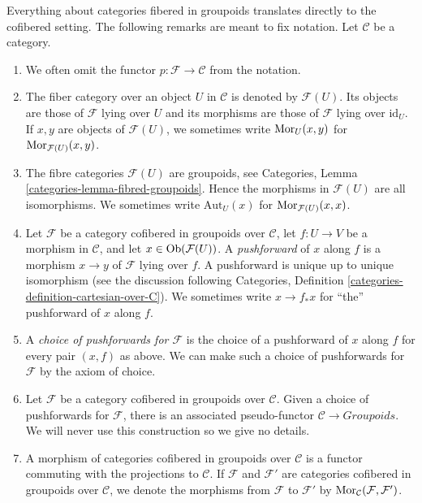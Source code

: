 \begin{remarks}
\label{remarks-cofibered-groupoids}
Everything about categories fibered in groupoids translates directly to the
cofibered setting. The following remarks are meant to fix notation.
Let $\mathcal{C}$ be a category.
\begin{enumerate}
\item We often omit the functor $p: \mathcal{F} \to \mathcal{C}$ from the
notation.
\item The fiber category over an object $U$ in $\mathcal{C}$ is denoted by
$\mathcal{F}(U)$. Its objects are those of $\mathcal{F}$ lying over $U$ and its
morphisms are those of $\mathcal{F}$ lying over $\text{id}_U$.
If $x, y$  are objects of $\mathcal{F}(U)$, we sometimes write
$\mathop{\mathrm{Mor}}\nolimits_U(x, y)$ for $\mathop{\mathrm{Mor}}\nolimits_{\mathcal{F}(U)}(x, y)$.
\item The fibre categories $\mathcal{F}(U)$ are groupoids, see
Categories, Lemma \ref{categories-lemma-fibred-groupoids}.
Hence the morphisms in $\mathcal{F}(U)$ are all isomorphisms.
We sometimes write $\text{Aut}_U(x)$ for $\mathop{\mathrm{Mor}}\nolimits_{\mathcal{F}(U)}(x, x)$.
\item
\label{item-pushforward}
Let $\mathcal{F}$ be a category cofibered in groupoids over
$\mathcal{C}$, let $f: U \to V$ be a morphism in $\mathcal{C}$, and
let $x \in \mathop{\mathrm{Ob}}\nolimits(\mathcal{F}(U))$.
A {\it pushforward} of $x$ along $f$ is a morphism
$x \to y$ of $\mathcal{F}$ lying over $f$. A pushforward
is unique up to unique isomorphism (see the discussion following
Categories, Definition \ref{categories-definition-cartesian-over-C}).
We sometimes write $x \to f_*x$ for ``the'' pushforward of $x$
along $f$.
\item A {\it choice of pushforwards for $\mathcal{F}$} is the choice of
a pushforward of $x$ along $f$ for every pair $(x, f)$ as above. We can make
such a choice of pushforwards for $\mathcal{F}$ by the axiom of choice.
\item Let $\mathcal{F}$ be a category cofibered in groupoids over
$\mathcal{C}$. Given a choice of pushforwards for $\mathcal{F}$, there
is an associated pseudo-functor $\mathcal{C} \to \textit{Groupoids}$.
We will never use this construction so we give no details.
\item
\label{item-cofibered-morphism}
A morphism of categories cofibered in groupoids over $\mathcal{C}$ is a
functor commuting with the projections to $\mathcal{C}$. If $\mathcal{F}$
and $\mathcal{F}'$ are categories cofibered in groupoids over
$\mathcal{C}$, we denote the morphisms from $\mathcal{F}$ to $\mathcal{F}'$
by $\mathop{\mathrm{Mor}}\nolimits_\mathcal{C}(\mathcal{F}, \mathcal{F}')$.

\end{enumerate}
\end{remarks}
